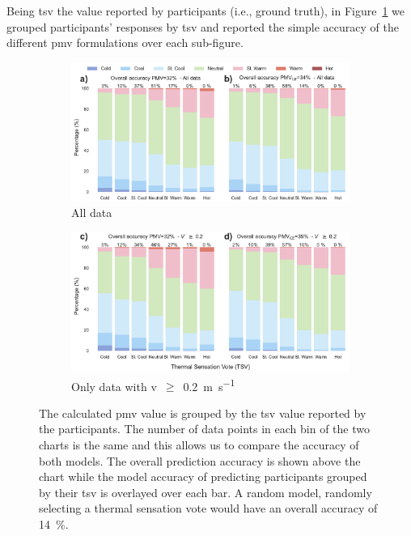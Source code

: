 Being \ac{tsv} the value reported by participants (i.e., ground truth), in Figure~\ref{fig:bar_stacked_model_accuracy} we grouped participants' responses by \ac{tsv} and reported the simple accuracy of the different \ac{pmv} formulations over each sub-figure.
\begin{figure}[htb!]
    \centering
    \begin{subfigure}[b]{\textwidth}
        \centering
        \includegraphics[width=\textwidth]{figures/bar_stacked_model_accuracy_0}
        \caption{All data}
    \end{subfigure}
    \begin{subfigure}[b]{\textwidth}
        \centering
        \includegraphics[width=\textwidth]{figures/bar_stacked_model_accuracy_0.2}
        \caption{Only data with \ac{v}~$\geq$~\qty{0.2}{\m\per\s}}
    \end{subfigure}
    \caption{The calculated \ac{pmv} value is grouped by the \ac{tsv} value reported by the participants.
    The number of data points in each bin of the two charts is the same and this allows us to compare the accuracy of both models.
    The overall prediction accuracy is shown above the chart while the model accuracy of predicting participants grouped by their \ac{tsv} is overlayed over each bar.
    A random model, randomly selecting a thermal sensation vote would have an overall accuracy of \qty{14}{\percent}.}
    \label{fig:bar_stacked_model_accuracy}
\end{figure}
